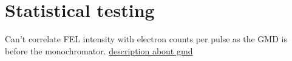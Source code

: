 




\section{Statistical testing}



Can't correlate FEL intensity with electron counts per pulse as the GMD is before the monochromator.  \href{https://photon-science.desy.de/facilities/flash/photon_diagnostics/gmd_intensity_and_position/index_eng.html}{description about gmd}

